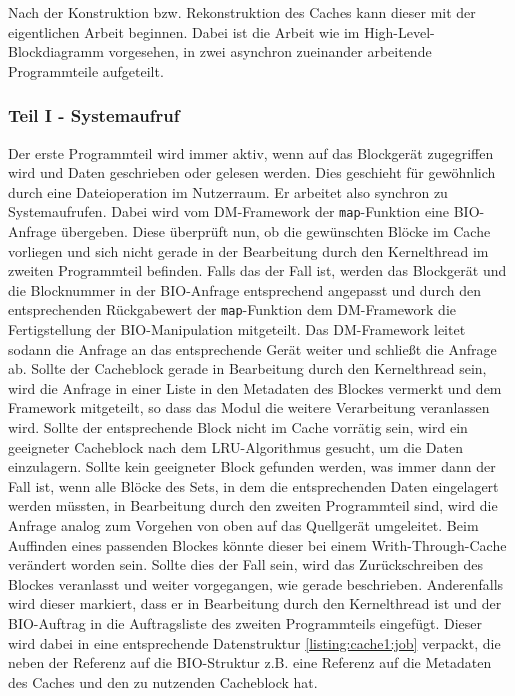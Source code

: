 Nach der Konstruktion bzw. Rekonstruktion des Caches kann dieser mit der eigentlichen Arbeit beginnen. Dabei ist die Arbeit wie im High-Level-Blockdiagramm
vorgesehen, in zwei asynchron zueinander arbeitende Programmteile aufgeteilt.

\subsubsection{Teil I - Systemaufruf}

Der erste Programmteil wird immer aktiv, wenn auf das Blockgerät zugegriffen wird und Daten geschrieben oder gelesen werden. Dies geschieht für gewöhnlich durch
eine Dateioperation im Nutzerraum. Er arbeitet also synchron zu Systemaufrufen. Dabei wird vom \ac{DM}-Framework der \texttt{map}-Funktion eine \ac{BIO}-Anfrage
übergeben. Diese überprüft nun, ob die gewünschten Blöcke im Cache vorliegen und sich nicht gerade in der Bearbeitung durch den Kernelthread im zweiten
Programmteil befinden. Falls das der Fall ist, werden das Blockgerät und die Blocknummer in der \ac{BIO}-Anfrage entsprechend angepasst und durch den
entsprechenden Rückgabewert der \texttt{map}-Funktion dem \ac{DM}-Framework die Fertigstellung der \ac{BIO}-Manipulation mitgeteilt. Das \ac{DM}-Framework leitet
sodann die Anfrage an das entsprechende Gerät weiter und schließt die Anfrage ab. Sollte der Cacheblock gerade in Bearbeitung durch den Kernelthread sein, wird
die Anfrage in einer Liste in den Metadaten des Blockes vermerkt und dem Framework mitgeteilt, so dass das Modul die weitere Verarbeitung veranlassen wird.
Sollte der entsprechende Block nicht im Cache vorrätig sein, wird ein geeigneter Cacheblock nach dem \ac{LRU}-Algorithmus gesucht, um die Daten einzulagern. Sollte kein
geeigneter Block gefunden werden, was immer dann der Fall ist, wenn alle Blöcke des Sets, in dem die entsprechenden Daten eingelagert werden müssten, in
Bearbeitung durch den zweiten Programmteil sind, wird die Anfrage analog zum Vorgehen von oben auf das Quellgerät umgeleitet. Beim Auffinden eines passenden
Blockes könnte dieser bei einem Writh-Through-Cache verändert worden sein. Sollte dies der Fall sein, wird das Zurückschreiben des Blockes veranlasst und weiter
vorgegangen, wie gerade beschrieben. Anderenfalls wird dieser markiert, dass er in Bearbeitung durch den Kernelthread ist und der \ac{BIO}-Auftrag in die
Auftragsliste des zweiten Programmteils eingefügt. Dieser wird dabei in eine entsprechende Datenstruktur \ref{listing:cache1:job} verpackt, die neben der
Referenz auf die \ac{BIO}-Struktur z.B. eine Referenz auf die Metadaten des Caches und den zu nutzenden Cacheblock hat.

